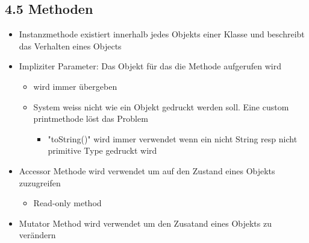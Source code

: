 \documentclass[11pt]{article}
\begin{document}
\subsection{4.5 Methoden}
\label{sec:org8f64edc}
\begin{itemize}
\item Instanzmethode existiert innerhalb jedes Objekts einer Klasse und beschreibt das Verhalten eines Objects\\
\item Impliziter Parameter: Das Objekt für das die Methode aufgerufen wird\\
\begin{itemize}
\item wird immer übergeben\\
\item System weiss nicht wie ein Objekt gedruckt werden soll. Eine custom printmethode löst das Problem\\
\begin{itemize}
\item "toString()" wird immer verwendet wenn ein nicht String resp nicht primitive Type gedruckt wird\\
\end{itemize}
\end{itemize}
\item Accessor Methode wird verwendet um auf den Zustand eines Objekts zuzugreifen\\
\begin{itemize}
\item Read-only method\\
\end{itemize}
\item Mutator Method wird verwendet um den Zusatand eines Objekts zu verändern\\
\end{itemize}
\end{document}
